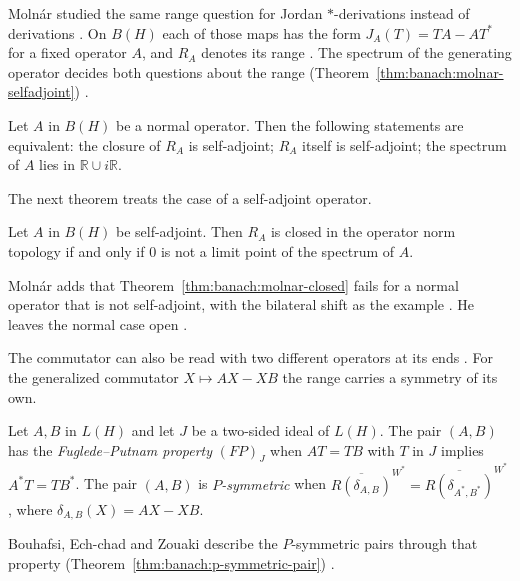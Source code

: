 Moln\'ar studied the same range question for Jordan $*$-derivations instead
of derivations \cite[p.~691]{Molnar1994Range}. On $B(H)$ each of those maps has
the form $J_A(T)=TA-AT^*$ for a fixed operator $A$, and $R_A$ denotes its range
\cite[p.~692]{Molnar1994Range}. The spectrum of the generating operator decides
both questions about the range (Theorem~\ref{thm:banach:molnar-selfadjoint}) \cite[p.~692]{Molnar1994Range}.

\begin{theorem}\label{thm:banach:molnar-selfadjoint}
Let $A$ in $B(H)$ be a normal operator. Then the following statements are
equivalent: the closure of $R_A$ is self-adjoint; $R_A$ itself is self-adjoint;
the spectrum of $A$ lies in $\mathbb{R}\cup i\mathbb{R}$.
\end{theorem}

The next theorem treats the case of a self-adjoint operator.

\begin{theorem}\label{thm:banach:molnar-closed}
Let $A$ in $B(H)$ be self-adjoint. Then $R_A$ is closed in the operator norm
topology if and only if $0$ is not a limit point of the spectrum of $A$.
\end{theorem}

Moln\'ar adds that Theorem~\ref{thm:banach:molnar-closed} fails for a normal
operator that is not self-adjoint, with the bilateral shift as the example
\cite[Remark~2, p.~694]{Molnar1994Range}. He leaves the normal case open
\cite[p.~694]{Molnar1994Range}.

The commutator can also be read with two different operators at its ends
\cite[p.~145]{BouhafsiEchChadZouaki2022}. For the generalized commutator
$X\mapsto AX-XB$ the range carries a symmetry of its own.

\begin{definition}\label{def:banach:p-symmetric-pair}
Let $A,B$ in $L(H)$ and let $J$ be a two-sided ideal of $L(H)$. The pair
$(A,B)$ has the \emph{Fuglede--Putnam property} $(FP)_J$ when $AT=TB$ with $T$
in $J$ implies $A^*T=TB^*$. The pair $(A,B)$ is \emph{$P$-symmetric} when
$\overline{R(\delta_{A,B})}^{W^*}=\overline{R(\delta_{A^*,B^*})}^{W^*}$,
where $\delta_{A,B}(X)=AX-XB$.
\end{definition}

Bouhafsi, Ech-chad and Zouaki describe the $P$-symmetric pairs through that
property (Theorem~\ref{thm:banach:p-symmetric-pair}) \cite[p.~149]{BouhafsiEchChadZouaki2022}.

